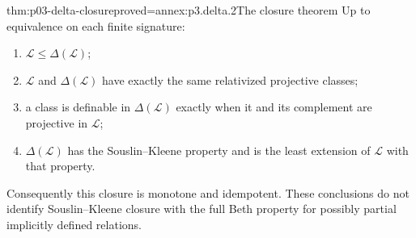 \begin{hbtheorem}{thm:p03-delta-closure}{proved=annex:p3.delta.2}{The closure theorem}
Up to equivalence on each finite signature:
\begin{enumerate}
\item \(\mathcal L\leq\Delta(\mathcal L)\);
\item \(\mathcal L\) and \(\Delta(\mathcal L)\) have exactly the
      same relativized projective classes;
\item a class is definable in \(\Delta(\mathcal L)\) exactly when
      it and its complement are projective in \(\mathcal L\);
\item \(\Delta(\mathcal L)\) has the Souslin--Kleene property and
      is the least extension of \(\mathcal L\) with that property.
\end{enumerate}
Consequently this closure is monotone and idempotent. These conclusions
do not identify Souslin--Kleene closure with the full Beth property for
possibly partial implicitly defined relations.
\end{hbtheorem}

